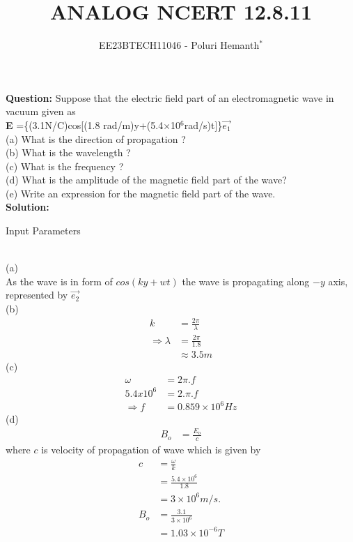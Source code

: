 \documentclass[journal,12pt,twocolumn]{IEEEtran}
\theoremstyle{remark}
\begin{document}

\vspace{3cm}

\title{ANALOG NCERT 12.8.11}
\author{EE23BTECH11046 - Poluri Hemanth$^{*}$}
\maketitle
\textbf{Question:}
Suppose that the electric field part of an electromagnetic wave
in vacuum given as\\ \textbf{E} =\{(3.1N/C)cos[(1.8 rad/m)y+(5.4$\times$10$^{6}$rad/s)t]\}$\vec{e_1}$ \\
(a) What is the direction of propagation ?\\
(b) What is the wavelength ? \\
(c) What is the frequency ?\\
(d) What is the amplitude of the magnetic field part of the wave?\\
(e) Write an expression for the magnetic field part of the wave.\\
\textbf{Solution:}
\fi
\begin{table}[h!]
    
    \caption{Input Parameters}
    \label{tab:12.8.11}
\end{table}\\
(a)\\
As the wave is in form of $cos(ky+wt)$
the wave is propagating along $-y$ axis, represented by $\vec{e_2}$\\
(b)
\begin{align}
	k&=\frac{2\pi}{\lambda} \\
	\Rightarrow\lambda&=\frac{2\pi}{1.8}\\
	&\approx3.5m
\end{align}
(c)
\begin{align} 
	\omega&=2\pi.f \\
	 5.4 x 10^{6} &=2.\pi.f \\
	\Rightarrow f &= 0.859 \times 10^{6} Hz    
\end{align}
(d)
\begin{align}
	B_o&=\frac{E_o}{c}
\end{align}
where $c$ is velocity of propagation of wave which is given by
\begin{align}
	c&=\frac{\omega}{k} \\
	&=\frac{5.4 \times 10^{6}}{1.8}\\
	&=3 \times 10^{6}m/s.\\
	B_o&= \frac{3.1}{3 \times 10^{6}}\\
	&= 1.03 \times 10^{-6}T\label{1[12.8.11]}
\end{align}
\end{document}
